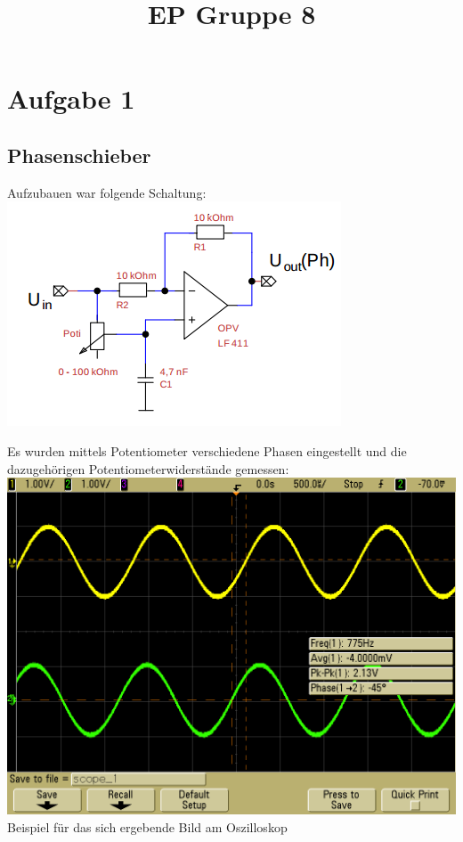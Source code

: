 \documentclass[compress,11pt]{beamer}
\title{EP Gruppe 8}
\begin{document}
\section{Aufgabe 1}
\subsection{Phasenschieber}

\begin{frame}
Aufzubauen war folgende Schaltung:\\
\includegraphics[width=.7\textwidth]{schalt/phasenschieber}\\

\end{frame}
\begin{frame}

\end{frame}
\begin{frame}
Es wurden mittels Potentiometer verschiedene Phasen eingestellt und die dazugehörigen Potentiometerwiderstände gemessen:\\
\includegraphics[width=.7\textwidth]{../oszi/scope_1}\\
Beispiel für das sich ergebende Bild am Oszilloskop

\end{frame}
\end{document}
